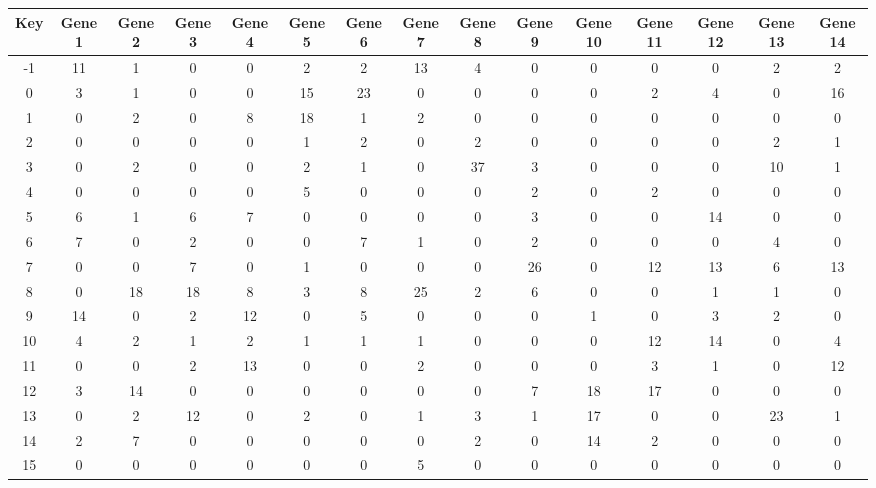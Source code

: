 \begin{tabular}{|c|c|c|c|c|c|c|c|c|c|c|c|c|c|c|}
\hline
Key & Gene 1 & Gene 2 & Gene 3 & Gene 4 & Gene 5 & Gene 6 & Gene 7 & Gene 8 & Gene 9 & Gene 10 & Gene 11 & Gene 12 & Gene 13 & Gene 14 \\
\hline
-1 & 11 & 1 & 0 & 0 & 2 & 2 & 13 & 4 & 0 & 0 & 0 & 0 & 2 & 2 \\
0 & 3 & 1 & 0 & 0 & 15 & 23 & 0 & 0 & 0 & 0 & 2 & 4 & 0 & 16 \\
1 & 0 & 2 & 0 & 8 & 18 & 1 & 2 & 0 & 0 & 0 & 0 & 0 & 0 & 0 \\
2 & 0 & 0 & 0 & 0 & 1 & 2 & 0 & 2 & 0 & 0 & 0 & 0 & 2 & 1 \\
3 & 0 & 2 & 0 & 0 & 2 & 1 & 0 & 37 & 3 & 0 & 0 & 0 & 10 & 1 \\
4 & 0 & 0 & 0 & 0 & 5 & 0 & 0 & 0 & 2 & 0 & 2 & 0 & 0 & 0 \\
5 & 6 & 1 & 6 & 7 & 0 & 0 & 0 & 0 & 3 & 0 & 0 & 14 & 0 & 0 \\
6 & 7 & 0 & 2 & 0 & 0 & 7 & 1 & 0 & 2 & 0 & 0 & 0 & 4 & 0 \\
7 & 0 & 0 & 7 & 0 & 1 & 0 & 0 & 0 & 26 & 0 & 12 & 13 & 6 & 13 \\
8 & 0 & 18 & 18 & 8 & 3 & 8 & 25 & 2 & 6 & 0 & 0 & 1 & 1 & 0 \\
9 & 14 & 0 & 2 & 12 & 0 & 5 & 0 & 0 & 0 & 1 & 0 & 3 & 2 & 0 \\
10 & 4 & 2 & 1 & 2 & 1 & 1 & 1 & 0 & 0 & 0 & 12 & 14 & 0 & 4 \\
11 & 0 & 0 & 2 & 13 & 0 & 0 & 2 & 0 & 0 & 0 & 3 & 1 & 0 & 12 \\
12 & 3 & 14 & 0 & 0 & 0 & 0 & 0 & 0 & 7 & 18 & 17 & 0 & 0 & 0 \\
13 & 0 & 2 & 12 & 0 & 2 & 0 & 1 & 3 & 1 & 17 & 0 & 0 & 23 & 1 \\
14 & 2 & 7 & 0 & 0 & 0 & 0 & 0 & 2 & 0 & 14 & 2 & 0 & 0 & 0 \\
15 & 0 & 0 & 0 & 0 & 0 & 0 & 5 & 0 & 0 & 0 & 0 & 0 & 0 & 0 \\
\hline
\end{tabular}